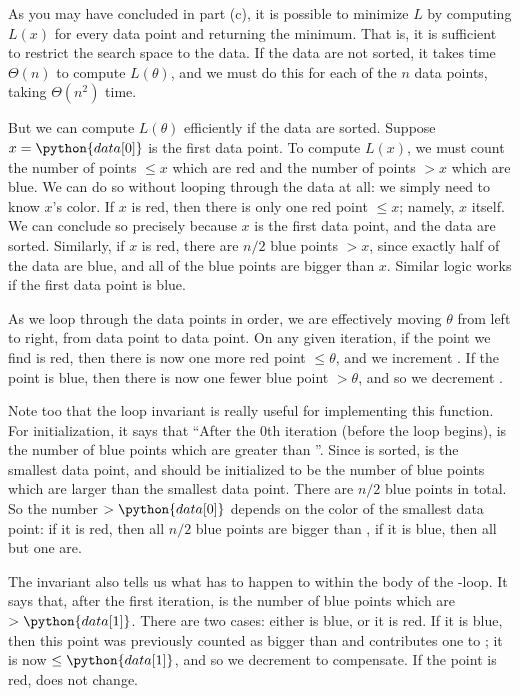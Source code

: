 \begin{soln}
    As you may have concluded in part (c), it is possible to minimize
    $L$ by computing $L(x)$ for every data point and returning the minimum.
    That is, it is sufficient to restrict the search space to the data.
    If the data are not sorted, it takes time $\Theta(n)$ to compute $L(\theta)$,
    and we must do this for each of the $n$ data points, taking $\Theta(n^2)$ time.

    But we can compute $L(\theta)$ efficiently if the data are sorted.
    Suppose $x = \python{data[0]}$ is the first data point. To compute $L(x)$,
    we must count the number of points $\leq x$ which are red and the
    number of points $> x$ which are blue. We can do so without looping
    through the data at all: we simply need to know $x$'s color.
    If $x$ is red, then there is only one red point $\leq x$; namely,
    $x$ itself. We can conclude so precisely because $x$ is the first
    data point, and the data are sorted. Similarly, if $x$ is red,
    there are $n/2$ blue points $> x$, since exactly half of the data are
    blue, and all of the blue points are bigger than $x$. Similar logic
    works if the first data point is blue.

    As we loop through the data points in order, we are effectively
    moving $\theta$ from left to right, from data point to data point.
    On any given iteration, if the point we find is red, then there
    is now one more red point $\leq \theta$, and we increment .
    If the point is blue, then there is now one fewer blue point $> \theta$,
    and so we decrement .

    Note too that the loop invariant is really useful for implementing
    this function. For initialization, it says that ``After the 0th iteration (before the loop begins),
     is the number of blue points which are greater
    than ''. Since  is sorted, 
    is the smallest data point, and  should be initialized
    to be the number of blue points which are larger than the smallest data point.
    There are $n/2$ blue points in total. So the number $> \python{data[0]}$ depends
    on the color of the smallest data point: if it is red, then all $n/2$ blue points
    are bigger than , if it is blue, then all but one are.

    The invariant also tells us what has to happen to 
    within the body of the -loop. It says that, after the
    first iteration,  is the number of blue
    points which are $> \python{data[1]}$. There are two cases:
    either  is blue, or it is red. If it is blue, then this
    point was previously counted as bigger than  and contributes
    one to ; it is now $\leq \python{data[1]}$,
    and so we decrement  to compensate. If the
    point is red,  does not change.

    \inputminted{python}{\solutiondir/minimize_ell_theta.py}

\end{soln}
